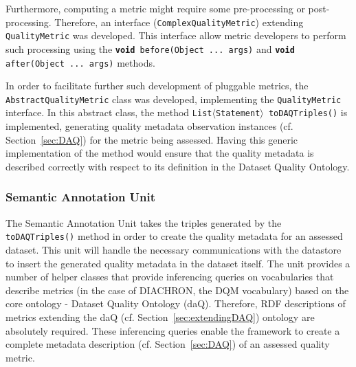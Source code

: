 Furthermore, computing a metric might require some pre-processing or post-processing.
Therefore, an interface (\texttt{ComplexQualityMetric}) extending \texttt{QualityMetric} was developed.
This interface allow metric developers to perform such processing using the \texttt{\textbf{void} before(Object ... args)} and \texttt{\textbf{void} after(Object ... args)} methods.

In order to facilitate further such development of pluggable metrics, the \texttt{AbstractQualityMetric} class was developed, implementing the \texttt{QualityMetric} interface.
In this abstract class, the method \texttt{List$\langle$Statement$\rangle$ toDAQTriples()} is implemented, generating quality metadata observation instances (cf. Section~\ref{sec:DAQ}) for the metric being assessed.
Having this generic implementation of the method would ensure that the quality metadata is described correctly with respect to its definition in the Dataset Quality Ontology.

\subsubsection{Semantic Annotation Unit}
The Semantic Annotation Unit takes the triples generated by the \texttt{toDAQTriples()} method in order to create the quality metadata for an assessed dataset.
This unit will handle the necessary communications with the datastore to insert the generated quality metadata in the dataset itself.
The unit provides a number of helper classes that provide inferencing queries on vocabularies that describe metrics (in the case of DIACHRON, the DQM vocabulary) based on the core ontology - Dataset Quality Ontology (daQ).
Therefore, RDF descriptions of metrics extending the daQ (cf. Section~\ref{sec:extendingDAQ}) ontology are absolutely required.
These inferencing queries enable the framework to create a complete metadata description (cf. Section~\ref{sec:DAQ}) of an assessed quality metric.




